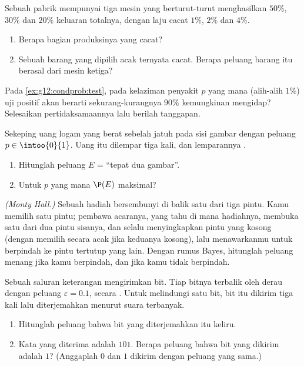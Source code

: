 \begin{exercise}[$\star\star$]\label{exo:g12:condprob:4}
Sebuah pabrik mempunyai tiga mesin yang berturut-turut menghasilkan $50\%$, $30\%$ dan
$20\%$ keluaran totalnya, dengan laju cacat $1\%$, $2\%$ dan $4\%$.
\begin{enumerate}
  \item Berapa bagian produksinya yang cacat?
  \item Sebuah barang yang dipilih acak ternyata cacat. Berapa peluang barang itu
        berasal dari mesin ketiga?
\end{enumerate}
\end{exercise}

\begin{exercise}[$\star\star$]\label{exo:g12:condprob:5}
Pada \cref{ex:g12:condprob:test}, pada kelaziman penyakit $p$ yang mana (alih-alih
$1\%$) uji positif akan berarti sekurang-kurangnya $90\%$ kemungkinan mengidap? Selesaikan
pertidaksamaannya lalu berilah tanggapan.
\end{exercise}

\begin{exercise}[$\star\star$]\label{exo:g12:condprob:6}
Sekeping uang logam yang berat sebelah jatuh pada sisi gambar dengan peluang $p \in \intoo{0}{1}$.
Uang itu dilempar tiga kali, dan lemparannya .
\begin{enumerate}
  \item Hitunglah peluang  $E$ = ``tepat dua gambar''.
  \item Untuk $p$ yang mana $\P(E)$ maksimal?
\end{enumerate}
\end{exercise}

\begin{exercise}[$\star\star\star$]\label{exo:g12:condprob:7}
\emph{(Monty Hall.)} Sebuah hadiah bersembunyi di balik satu dari tiga pintu. Kamu memilih
satu pintu; pembawa acaranya, yang tahu di mana hadiahnya, membuka satu dari dua
pintu sisanya, dan selalu menyingkapkan pintu yang kosong (dengan memilih secara acak jika
keduanya kosong), lalu menawarkanmu untuk berpindah ke pintu tertutup yang lain. Dengan
rumus Bayes, hitunglah peluang menang jika kamu berpindah, dan jika
kamu tidak berpindah.
\end{exercise}

\begin{exercise}[$\star\star\star$]\label{exo:g12:condprob:8}
Sebuah saluran keterangan mengirimkan bit. Tiap bitnya terbalik oleh derau dengan
peluang $\varepsilon = 0.1$, secara . Untuk melindungi satu bit, bit itu dikirim
tiga kali lalu diterjemahkan menurut suara terbanyak.
\begin{enumerate}
  \item Hitunglah peluang bahwa bit yang diterjemahkan itu keliru.
  \item Kata yang diterima adalah $101$. Berapa peluang bahwa bit yang
        dikirim adalah $1$? (Anggaplah $0$ dan $1$ dikirim dengan peluang yang sama.)
\end{enumerate}
\end{exercise}

